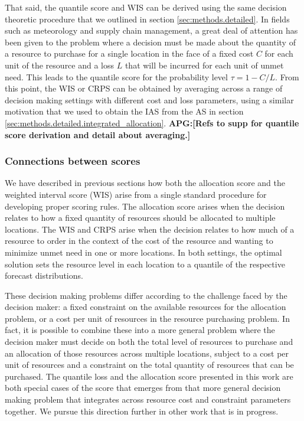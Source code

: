 \documentclass{article}\usepackage[]{graphicx}\usepackage[]{xcolor}
\def\apg#1{{\color{red}\textbf{APG:[#1]}}}
\def\ngr#1{{\color{blue}\textbf{NGR:[#1]}}}
\begin{document}
That said, the quantile score and WIS can be derived using the same decision theoretic procedure that we outlined in section \ref{sec:methods.detailed}.
In fields such as meteorology and supply chain management, a great deal of attention has been given to the problem where a decision must be made about the quantity of a resource to purchase for a single location in the face of a fixed cost $C$ for each unit of the resource and a loss $L$ that will be incurred for each unit of unmet need.
This leads to the quantile score for the probability level $\tau = 1 - C/L$.
From this point, the WIS or CRPS can be obtained by averaging across a range of decision making settings with different cost and loss parameters, using a similar motivation that we used to obtain the IAS from the AS in section \ref{sec:methods.detailed.integrated_allocation}.
\apg{Refs to supp for quantile score derivation and detail about averaging.}

\subsubsection{Connections between scores}
\label{sec:methods.generalization}

We have described in previous sections how both the allocation score and the weighted interval score (WIS) arise from a single standard procedure for developing proper scoring rules.
The allocation score arises when the decision relates to how a fixed quantity of resources should be allocated to multiple locations.
The WIS and CRPS arise when the decision relates to how much of a resource to order in the context of the cost of the resource and wanting to minimize unmet need in one or more locations.
In both settings, the optimal solution sets the resource level in each location to a quantile of the respective forecast distributions.

These decision making problems differ according to the challenge faced by the decision maker: a fixed constraint on the available resources for the allocation problem, or a cost per unit of resources in the resource purchasing problem. In fact, it is possible to combine these into a more general problem where the decision maker must decide on both the total level of resources to purchase and an allocation of those resources across multiple locations, subject to a cost per unit of resources and a constraint on the total quantity of resources that can be purchased. The quantile loss and the allocation score presented in this work are both special cases of the score that emerges from that more general decision making problem that integrates across resource cost and constraint parameters together. We pursue this direction further in other work that is in progress.
\end{document}
